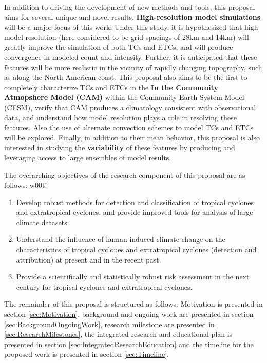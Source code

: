 \documentclass[11pt]{article}
\begin{document}
In addition to driving the development of new methods and tools, this proposal aims for several unique and novel results.  \textbf{High-resolution model simulations} will be a major focus of this work:  Under this study, it is hypothesized that high model resolution (here considered to be grid spacings of 28km and 14km) will greatly improve the simulation of both TCs and ETCs, and will produce convergence in modeled count and intensity.  Further, it is anticipated that these features will be more realistic in the vicinity of rapidly changing topography, such as along the North American coast.  This proposal also aims to be the first to completely characterize TCs and ETCs in the \textbf{In the Community Atmopshere Model (CAM)} within the Community Earth System Model (CESM), verify that CAM produces a climatology consistent with observational data, and understand how model resolution plays a role in resolving these features.  Also the use of alternate convection schemes to model TCs and ETCs will be explored.  Finally, in addition to their mean behavior, this proposal is also interested in studying the \textbf{variability} of these features by producing and leveraging access to large ensembles of model results.

The overarching objectives of the research component of this proposal are as follows: w00t!

\begin{enumerate}
\item Develop robust methods for detection and classification of tropical cyclones and extratropical cyclones, and provide improved tools for analysis of large climate datasets.

\item Understand the influence of human-induced climate change on the characteristics of tropical cyclones and extratropical cyclones (detection and attribution) at present and in the recent past.

\item Provide a scientifically and statistically robust risk assessment in the next century for tropical cyclones and extratropical cyclones.
\end{enumerate}

The remainder of this proposal is structured as follows: Motivation is presented in section \ref{sec:Motivation}, background and ongoing work are presented in section \ref{sec:BackgroundOngoingWork}, research milestone are presented in \ref{sec:ResearchMilestones}, the integrated research and educational plan is presented in section \ref{sec:IntegratedResearchEducation} and the timeline for the proposed work is presented in section \ref{sec:Timeline}.
\end{document}
